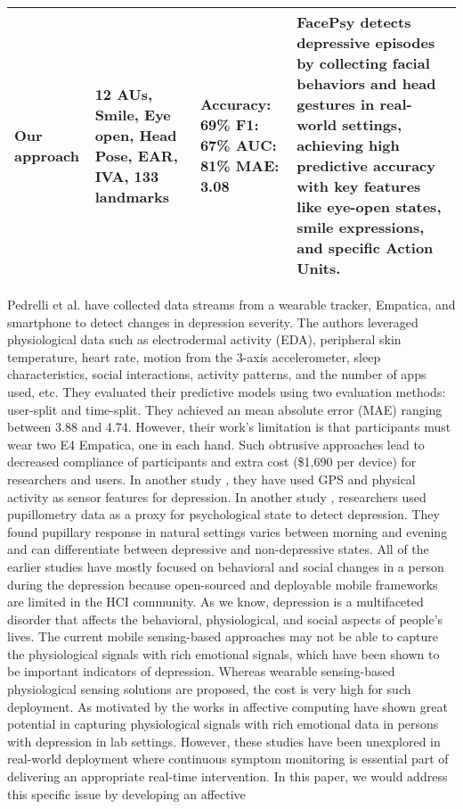 \begin{table}[h]
\begin{tabular}{p{2cm}p{3cm}p{2cm}p{5.5cm}}
Our approach & 12 AUs, Smile, Eye open, Head Pose, EAR, IVA, 133 landmarks & Accuracy: 69\% \newline F1: 67\% \newline AUC: 81\% \newline MAE: 3.08 & FacePsy detects depressive episodes by collecting facial behaviors and head gestures in real-world settings, achieving high predictive accuracy with key features like eye-open states, smile expressions, and specific Action Units. \\

\bottomrule
\end{tabular}
\end{table}

Pedrelli et al. \cite{pedrelli2020monitoring} have collected data streams from a wearable tracker, Empatica, and smartphone to detect changes in depression severity. The authors leveraged physiological data such as electrodermal activity (EDA), peripheral skin temperature, heart rate, motion from the 3-axis accelerometer, sleep characteristics, social interactions, activity patterns, and the number of apps used, etc. They evaluated their predictive models using two evaluation methods: user-split and time-split. They achieved an mean absolute error (MAE) ranging between 3.88 and 4.74. However, their work's limitation is that participants must wear two E4 Empatica, one in each hand. Such obtrusive approaches lead to decreased compliance of participants and extra cost (\$1,690 per device) for researchers and users. In another study \cite{farhan2016behavior}, they have used GPS and physical activity as sensor features for depression. In another study \cite{islam2024pupilsense}, researchers used pupillometry data as a proxy for psychological state to detect depression. They found pupillary response in natural settings varies between morning and evening and can differentiate between depressive and non-depressive states. All of the earlier studies have mostly focused on behavioral and social changes in a person during the depression because open-sourced and deployable mobile frameworks are limited in the HCI community. As we know, depression is a multifaceted disorder that affects the behavioral, physiological, and social aspects of people's lives. The current mobile sensing-based approaches \cite{opoku2022mood, chikersal2021detecting, farhan2016behavior} may not be able to capture the physiological signals with rich emotional signals, which have been shown to be important indicators of depression. Whereas wearable sensing-based physiological sensing solutions are proposed, the cost is very high for such deployment. As motivated by the works \cite{cohn2009detecting, valstar2013avec, song2020spectral, kong2022automatic, casado2023depression} in affective computing have shown great potential in capturing physiological signals with rich emotional data in persons with depression in lab settings. However, these studies have been unexplored in real-world deployment where continuous symptom monitoring is essential part of delivering an appropriate real-time intervention. In this paper, we would address this specific issue by developing an affective 